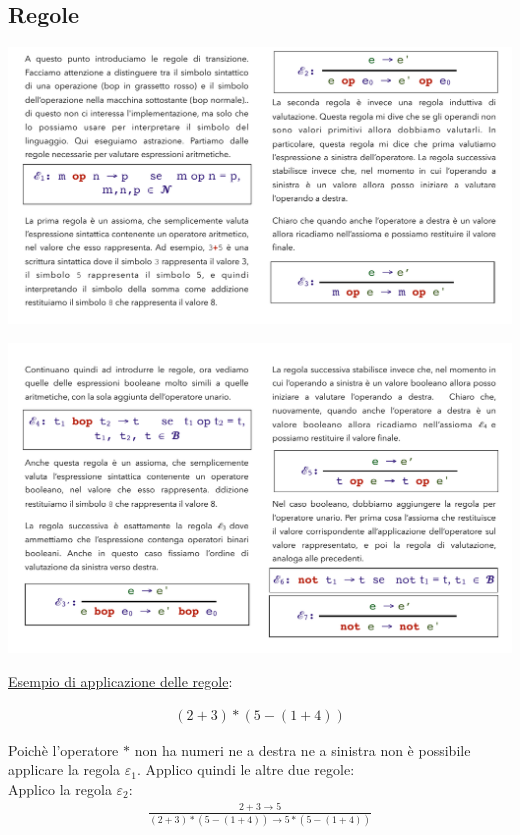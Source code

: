 \documentclass[a4paper, 10pt]{report}
\begin{document}
\subsection*{Regole}

\begin{center}
\includegraphics[scale=0.8]{exp1.pdf}

\includegraphics[scale=0.8]{exp2.pdf}
\end{center}

\noindent \underline{Esempio di applicazione delle regole}:

\begin{align*}
(2 + 3) * (5 - (1 + 4))
\end{align*}

\noindent Poichè l'operatore $*$ non ha numeri ne a destra ne a sinistra non è possibile applicare la regola $\varepsilon_1$. Applico quindi le altre due regole:\\

Applico la regola $\varepsilon_2$:
\begin{align*}
\frac{2 + 3 \rightarrow 5}{(2+3)*(5-(1+4)) \rightarrow 5*(5-(1+4))}
\end{align*}
\end{document}
